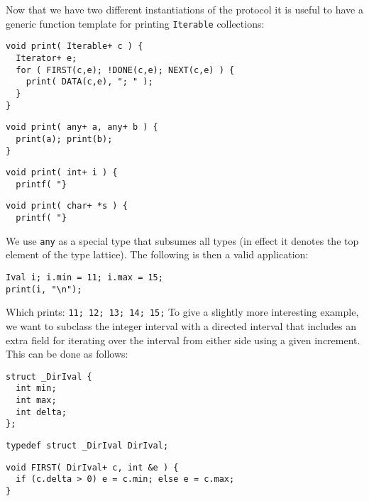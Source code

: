 \documentclass{sigplanconf}
\begin{document}
Now that we have two different instantiations of the protocol it is
useful to have a generic function template for printing
\verb+Iterable+ collections:
\begin{samepage}
\begin{verbatim}
void print( Iterable+ c ) {
  Iterator+ e;
  for ( FIRST(c,e); !DONE(c,e); NEXT(c,e) ) {
    print( DATA(c,e), "; " );
  }
}
\end{verbatim}
\end{samepage}
\begin{samepage}
\begin{verbatim}
void print( any+ a, any+ b ) {
  print(a); print(b);
}
\end{verbatim}
\end{samepage}
\begin{samepage}
\begin{verbatim}
void print( int+ i ) {
  printf( "}
\end{verbatim}
\end{samepage}
\begin{samepage}
\begin{verbatim}
void print( char+ *s ) {
  printf( "}
\end{verbatim}
\end{samepage}
We use \verb+any+ as a special type that subsumes all types (in effect
it denotes the top element of the type lattice). The following is then
a valid application:
\begin{samepage}
\begin{verbatim}
Ival i; i.min = 11; i.max = 15;
print(i, "\n");
\end{verbatim}
\end{samepage}
Which prints: \verb+11; 12; 13; 14; 15;+
To give a slightly more interesting example, we want to subclass the
integer interval with a directed interval that includes an extra field
for iterating over the interval from either side using a given
increment. This can be done as follows:
\begin{samepage}
\begin{verbatim}
struct _DirIval {
  int min;
  int max;
  int delta;
};
\end{verbatim}
\end{samepage}
\begin{samepage}
\begin{verbatim}
typedef struct _DirIval DirIval;
\end{verbatim}
\end{samepage}
\begin{samepage}
\begin{verbatim}
void FIRST( DirIval+ c, int &e ) {
  if (c.delta > 0) e = c.min; else e = c.max;
}
\end{verbatim}
\end{samepage}
\end{document}
